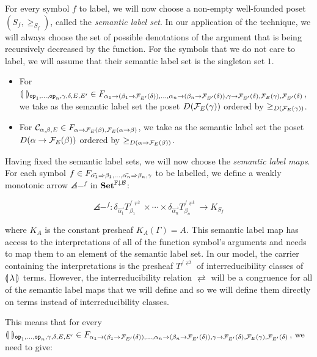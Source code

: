 For every symbol $f$ to label, we will now choose a non-empty well-founded
poset $(S_f, \ge_{S_f})$, called the \emph{semantic label set}. In our
application of the technique, we will always choose the set of possible
denotations of the argument that is being recursively decreased by the
function. For the symbols that we do not care to label, we will assume that
their semantic label set is the singleton set $1$.

\begin{itemize}
\item For
  $\llparenthesis \,  \, \rrparenthesis_{\mathtt{op}_1, \ldots, \mathtt{op}_n, \gamma, \delta, E, E'} \in
  F_{\alpha_1 \to (\beta_1 \to \mathcal{F}_{E'}(\delta)), \ldots, \alpha_n \to
    (\beta_n \to \mathcal{F}_{E'}(\delta)), \gamma \to \mathcal{F}_{E'}(\delta),
    \mathcal{F}_E(\gamma), \mathcal{F}_{E'}(\delta)}$, we take as the semantic label set
  the poset $D(\mathcal{F}_E(\gamma))$ ordered by $\ge_{D(\mathcal{F}_E(\gamma))}$.
\item For
  $\mathcal{C}_{\alpha,\beta,E} \in F_{\alpha \to \mathcal{F}_E(\beta),\mathcal{F}_E(\alpha \to
    \beta)}$, we take as the semantic label set the poset
  $D(\alpha \to \mathcal{F}_E(\beta))$ ordered by
  $\ge_{D(\alpha \to \mathcal{F}_E(\beta))}$.
\end{itemize}

Having fixed the semantic label sets, we will now choose the \emph{semantic
  label maps}. For each symbol
$f \in F_{\vec{\alpha_1} \Rightarrow \beta_1, \ldots, \vec{\alpha_n} \Rightarrow \beta_n,
  \gamma}$ to be labelled, we define a weakly monotonic arrow
$\angles{-}^f$ in $\mathbf{Set}^{\mathbb{F}\downarrow\mathcal{B}}$:

$$
\angles{-}^f : \delta_{\vec{\alpha_1}} T^{/\rightleftarrows}_{\beta_1}
\times \cdots \times \delta_{\vec{\alpha_n}}
T^{/\rightleftarrows}_{\beta_n} \longrightarrow K_{S_f}
$$

where $K_A$ is the constant presheaf $K_A(\Gamma) = A$. This semantic label
map has access to the interpretations of all of the function symbol's
arguments and needs to map them to an element of the semantic label set. In
our model, the carrier containing the interpretations is the presheaf
$T^{/\rightleftarrows}$ of interreducibility classes of ${\llparenthesis \, \lambda \, \rrparenthesis}$
terms. However, the interreducibility relation $\rightleftarrows$ will be a
congruence for all of the semantic label maps that we will define and so we
will define them directly on terms instead of interreducibility classes.

This means that for every
$\llparenthesis \,  \, \rrparenthesis_{\mathtt{op}_1, \ldots, \mathtt{op}_n, \gamma, \delta, E, E'} \in
F_{\alpha_1 \to (\beta_1 \to \mathcal{F}_{E'}(\delta)), \ldots, \alpha_n \to
  (\beta_n \to \mathcal{F}_{E'}(\delta)), \gamma \to \mathcal{F}_{E'}(\delta),
  \mathcal{F}_E(\gamma), \mathcal{F}_{E'}(\delta)}$, we need to give:


